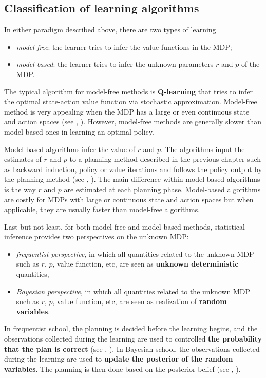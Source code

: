 \subsection{Classification of learning algorithms}
\label{ch:rl:ssec:class_algo}

In either paradigm described above, there are two types of learning
\begin{itemize}
    \item \emph{model-free}: the learner tries to infer the value functions in the MDP;
    \item \emph{model-based}: the learner tries to infer the unknown parameters $r$ and $p$ of the MDP.
\end{itemize}
The typical algorithm for model-free methods is \textbf{Q-learning} \cite{watkins1989learning} that tries to infer the optimal state-action value function via stochastic approximation. 
Model-free method is very appealing when the MDP has a large or even continuous state and action spaces (see \eg, \cite{mnih2015human, bellemare2017distributional, dabney2018distributional}).
However, model-free methods are generally slower than model-based ones in learning an optimal policy.

Model-based algorithms infer the value of $r$ and $p$. The algorithms input the estimates of $r$ and $p$ to a planning method described in the previous chapter such as backward induction, policy or value iterations and follows the policy output by the planning method (see \eg, \cite{jaksch2010near, osband2013more, azar2017minimax}).
The main difference within model-based algorithms is the way $r$ and $p$ are estimated at each planning phase.
Model-based algorithms are costly for MDPs with large or continuous state and action spaces but when applicable, they are usually faster than model-free algorithms.

Last but not least, for both model-free and model-based methods, statistical inference provides two perspectives on the unknown MDP:
\begin{itemize}
    \item \emph{frequentist perspective}, in which all quantities related to the unknown MDP such as $r$, $p$, value function, etc, are seen as \textbf{unknown deterministic} quantities,
    \item \emph{Bayesian perspective}, in which all quantities related to the unknown MDP such as $r$, $p$, value function, etc, are seen as realization of \textbf{random variables}.
\end{itemize}
In frequentist school, the planning is decided before the learning begins, and the observations collected during the learning are used to controlled \textbf{the probability that the plan is correct} (see \eg, \cite{jaksch2010near, azar2017minimax, jin2018q, shi2022pessimistic}).
In Bayesian school, the observations collected during the learning are used to \textbf{update the posterior of the random variables}.
The planning is then done based on the posterior belief (see \eg, \cite{osband2013more, ouyang2017learning, bellemare2017distributional, dabney2018distributional}).

